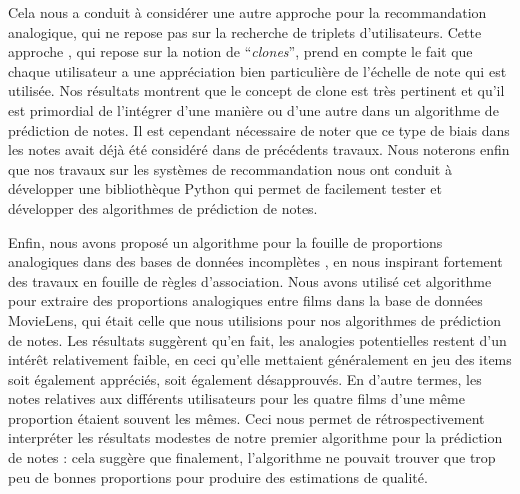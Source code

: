 Cela nous a conduit à considérer une autre approche pour la recommandation
analogique, qui ne repose pas sur la recherche de triplets d'utilisateurs.
Cette approche \cite{HugPraRicSerFuzzIEEE16}, qui repose sur la notion de
``\textit{clones}'', prend en compte le fait que chaque utilisateur a une
appréciation bien particulière de l'échelle de note qui est utilisée. Nos
résultats montrent que le concept de clone est très pertinent et qu'il est
primordial de l'intégrer d'une manière ou d'une autre dans un algorithme de
prédiction de notes. Il est cependant nécessaire de noter que ce type de biais
dans les notes avait déjà été considéré dans de précédents travaux. Nous
noterons enfin que nos travaux sur les systèmes de recommandation nous ont
conduit à développer une bibliothèque Python \cite{Surprise} qui permet de
facilement tester et développer des algorithmes de prédiction de notes.

Enfin, nous avons proposé un algorithme pour la fouille de proportions
analogiques dans des bases de données incomplètes \cite{HugPraRicSerLFA16}, en
nous inspirant fortement des travaux en fouille de règles d'association. Nous
avons utilisé cet algorithme pour extraire des proportions analogiques entre
films dans la base de données MovieLens, qui était celle que nous utilisions
pour nos algorithmes de prédiction de notes. Les résultats suggèrent qu'en fait,
les analogies potentielles restent d'un intérêt relativement faible, en ceci
qu'elle mettaient généralement en jeu des items soit également appréciés, soit
également désapprouvés. En d'autre termes, les notes relatives aux différents
utilisateurs pour les quatre films d'une même proportion étaient souvent les
mêmes. Ceci nous permet de rétrospectivement interpréter les résultats modestes
de notre premier algorithme pour la prédiction de notes : cela suggère que
finalement, l'algorithme ne pouvait trouver que trop peu de bonnes proportions
pour produire des estimations de qualité.\\


